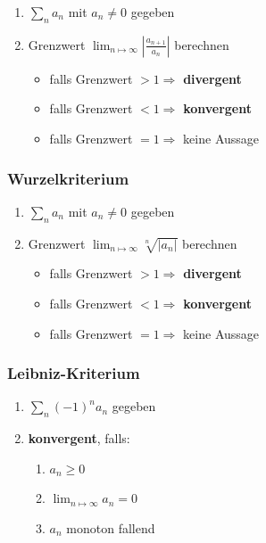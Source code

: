 \documentclass[11pt]{article}
\begin{document}
\begin{enumerate}
	\item $\sum_n a_n$ mit $a_n \neq 0$ gegeben
	\item Grenzwert $\lim_{n\mapsto\infty}|\frac{a_{n+1}}{a_n}|$ berechnen
	\begin{itemize}
		\item falls Grenzwert $> 1 \Rightarrow$ \textbf{divergent}
		\item falls Grenzwert $< 1 \Rightarrow$ \textbf{konvergent}
		\item falls Grenzwert $= 1 \Rightarrow$ keine Aussage
	\end{itemize}
\end{enumerate}

\subsubsection*{Wurzelkriterium}

\begin{enumerate}
	\item $\sum_n a_n$ mit $a_n \neq 0$ gegeben
	\item Grenzwert $\lim_{n\mapsto\infty}\sqrt[n]{|a_n|}$ berechnen
	\begin{itemize}
		\item falls Grenzwert $> 1 \Rightarrow$ \textbf{divergent}
		\item falls Grenzwert $< 1 \Rightarrow$ \textbf{konvergent}
		\item falls Grenzwert $= 1 \Rightarrow$ keine Aussage
	\end{itemize}
\end{enumerate}

\subsubsection*{Leibniz-Kriterium}

\begin{enumerate}
	\item $\sum_n (-1)^n a_n$ gegeben
	\item \textbf{konvergent}, falls:
	\begin{enumerate}
		\item $a_n \geq 0$
		\item $\lim_{n\mapsto\infty} a_n = 0$
		\item $a_n$ monoton fallend
	\end{enumerate}
\end{enumerate}
\end{document}

